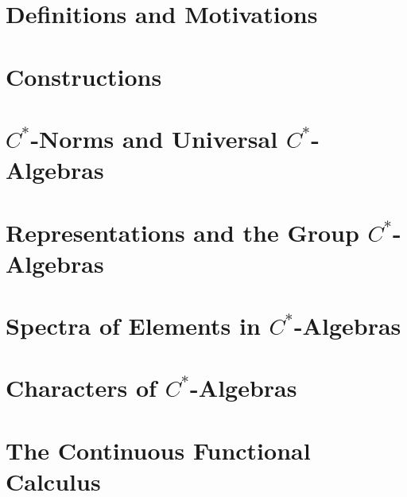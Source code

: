 \section{Definitions and Motivations}%

\section{Constructions}%
\section{$C^{\ast}$-Norms and Universal $C^{\ast}$-Algebras}%
\section{Representations and the Group $C^{\ast}$-Algebras}%
\section{Spectra of Elements in $C^{\ast}$-Algebras}%
\section{Characters of $C^{\ast}$-Algebras}%
\section{The Continuous Functional Calculus}%

